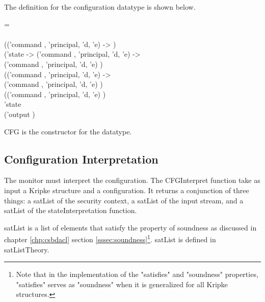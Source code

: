 \documentclass[../../main/main.tex]{subfiles}
\begin{document}
The definition for the configuration datatype is shown below.

\begin{tabbing}
\parskip=8pt
 = \\
\hspace{0.3cm}     \\
\hspace{0.5cm}  (('command , 'principal, 'd, 'e)  -> )\\
\hspace{0.5cm}    ('state -> ('command , 'principal, 'd, 'e)   -> \\
\hspace{0.5cm}    ('command , 'principal, 'd, 'e)  ) \\
 \hspace{0.5cm}   (('command , 'principal, 'd, 'e)   -> \\
\hspace{0.5cm}    ('command , 'principal, 'd, 'e)  ) \\
 \hspace{0.5cm}  (('command , 'principal, 'd, 'e)   ) \\
\hspace{0.5cm}   'state \\
\hspace{0.5cm} ('output )
\parskip=18pt
\end{tabbing}

CFG is the constructor for the datatype.

\subsection{Configuration Interpretation}
The monitor must interpret the configuration.  The CFGInterpret function take as input a Kripke structure and a configuration.  It returns a conjunction of three things: a satList of the security context, a satList of the input stream, and a satList of the stateInterpretation function.  

satList is a list of elements that satisfy the property of soundness as discussed in chapter \ref{chp:csbdacl} section \ref{sssec:soundness}\footnote{Note that in the  implementation of the "satisfies" and "soundness" properties, "satisfies" serves as "soundness" when it is generalized for all Kripke structures.}.  satList is defined in satListTheory.  
\end{document}
